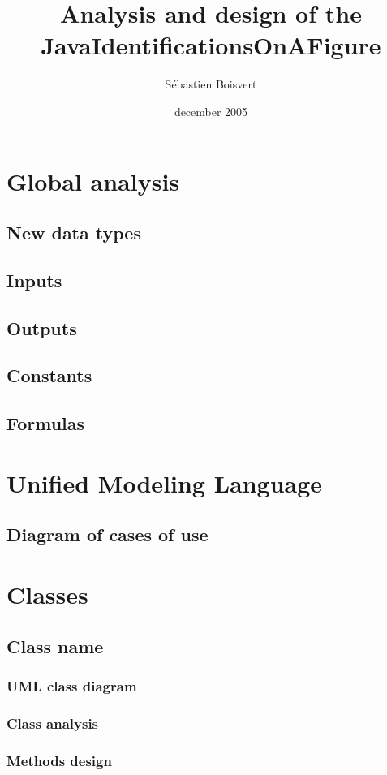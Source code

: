 \documentclass[letterpaper]{article}
\begin{document}
\title{Analysis and design of the JavaIdentificationsOnAFigure}
\author{Sébastien Boisvert}
\date{december 2005}

\maketitle


\thispagestyle{empty}


\newpage

\tableofcontents


\newpage
{}

\section{Global analysis}

\subsection{New data types}

\subsection{Inputs}

\subsection{Outputs}

\subsection{Constants}

\subsection{Formulas}


\section{Unified Modeling Language}

\subsection{Diagram of cases of use}


\section{Classes}

\subsection{Class name}

\subsubsection{UML class diagram}

\subsubsection{Class analysis}

\subsubsection{Methods design}
\end{document}
